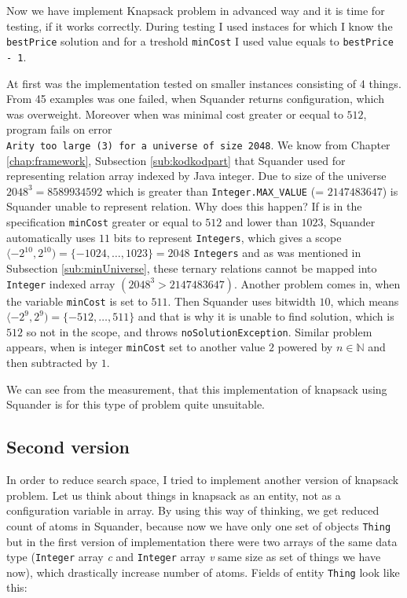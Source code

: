 \documentclass[11pt,twoside,a4paper]{book}
\begin{document}
Now we have implement Knapsack problem in advanced way and it is time for
testing, if it works correctly. During testing I used instaces for which I
know the \verb|bestPrice| solution and for a treshold \verb|minCost| I used
value equals to \verb|bestPrice - 1|.

At first was the implementation tested on smaller instances consisting of 4
things. From 45 examples was one failed, when Squander returns configuration,
which was overweight. Moreover when was minimal cost greater or eequal to
$512$, program fails on error\\ 
\verb|Arity too large (3) for a universe of size 2048|. We know from Chapter
\ref{chap:framework}, Subsection \ref{sub:kodkodpart} that Squander used for
representing relation array indexed by Java integer. Due to size of the universe
$2048^3 = 8589934592$ which is greater than \verb|Integer.MAX_VALUE| (=
$2147483647$) is Squander unable to represent relation. Why does this happen? If
is in the specification \verb|minCost| greater or equal to $512$ and lower than
$1023$, Squander automatically uses $11$ bits to represent \verb|Integers|,
which gives a scope $\langle-2^{10},2^{10}) = \{-1024,\ldots,1023\} = 2048$ \verb|Integers| and as was
mentioned in Subsection \ref{sub:minUniverse}, these ternary relations cannot be
mapped into \verb|Integer| indexed array $(2048^3 > 2147483647)$. Another
problem comes in, when the variable \verb|minCost| is set to $511$. Then
Squander uses bitwidth $10$, which means $\langle-2^9,2^9) =
\{-512,\ldots,511\}$ and that is why it is unable to find solution, which is $512$ so not in the scope,
and throws \verb|noSolutionException|. Similar problem appears, when is integer
\verb|minCost| set to another value $2$ powered by $n\in\mathbb{N}$ and then
subtracted by $1$.

We can see from the measurement, that this implementation of knapsack
using Squander is for this type of problem quite unsuitable.

\subsection{Second version}

In order to reduce search space, I tried to implement another version of
knapsack problem. Let us think about things in knapsack as an entity, not as a
configuration variable in array. By using this way of thinking, we get reduced
count of atoms in Squander, because now we have only one set of objects \verb|Thing| but in the
first version of implementation there were two arrays of the same data type
(\verb|Integer| array \textit{c} and \verb|Integer| array \textit{v} same size
as set of things we have now), which drastically increase number of atoms.
Fields of entity \verb|Thing| look like this:
\end{document}
